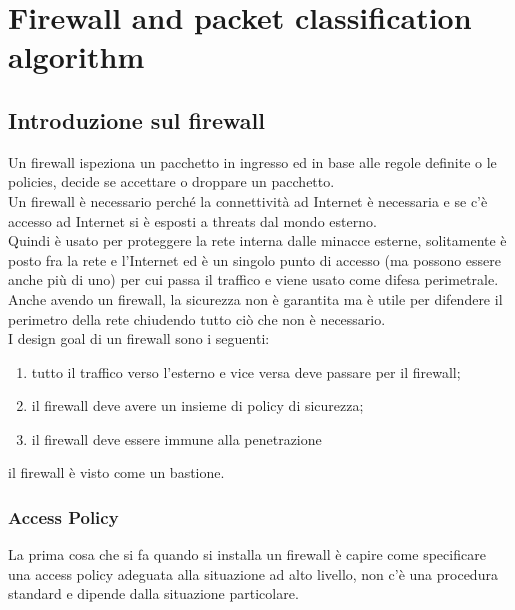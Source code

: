 \documentclass[12pt, oneside]{extbook} %
\begin{document}
\chapter*{Firewall and packet classification algorithm}

\section{Introduzione sul firewall}
Un firewall ispeziona un pacchetto in ingresso ed in base alle regole definite o le policies, decide se accettare o droppare un pacchetto.
\\Un firewall è necessario perché la connettività ad Internet è necessaria e se c'è accesso ad Internet si è esposti a threats dal mondo esterno.
\\Quindi è usato per proteggere la rete interna dalle minacce esterne, solitamente è posto fra la rete e l'Internet ed è un singolo punto di accesso (ma possono essere anche più di uno) per cui passa il traffico e viene usato come difesa perimetrale.
\\Anche avendo un firewall, la sicurezza non è garantita ma è utile per difendere il perimetro della rete chiudendo tutto ciò che non è necessario.
\\I design goal di un firewall sono i seguenti:
\begin{enumerate}
\item tutto il traffico verso l'esterno e vice versa deve passare per il firewall;
\item il firewall deve avere un insieme di policy di sicurezza;
\item il firewall deve essere immune alla penetrazione
\end{enumerate}
il firewall è visto come un bastione. 

\subsection{Access Policy}
La prima cosa che si fa quando si installa un firewall è capire come specificare una access policy adeguata alla situazione ad alto livello, non c'è una procedura standard e dipende dalla situazione particolare.
\end{document}
